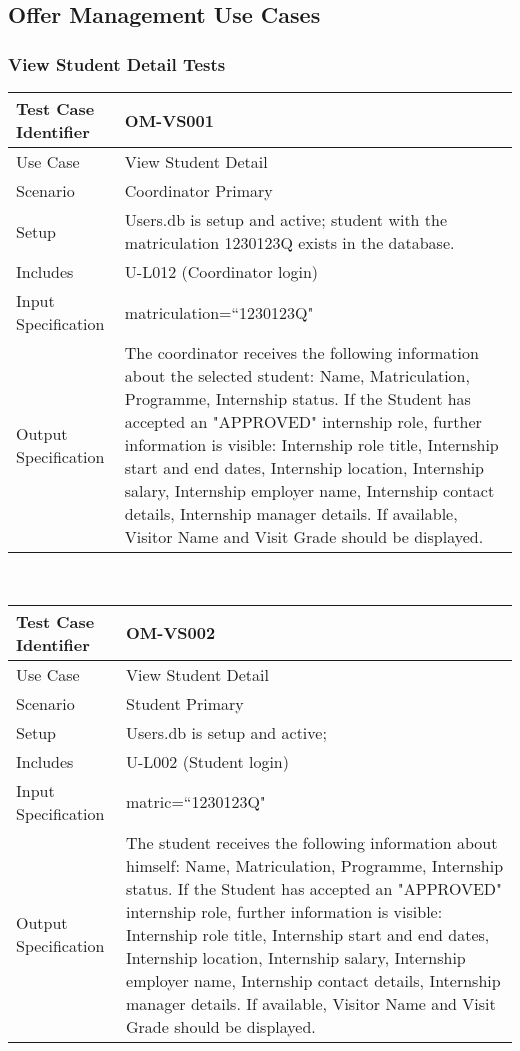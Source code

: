 \documentclass{l3deliverable}
\begin{document}
\newpage
\subsection{Offer Management Use Cases}
\subsubsection{View Student Detail Tests}
\begin{tabular}{lp{10cm}}
\hline 
\textbf{Test Case Identifier} & OM-VS001\tabularnewline
\hline 
\hline 
Use Case & View Student Detail \tabularnewline
\hline 
Scenario & Coordinator Primary \tabularnewline
\hline 
Setup & Users.db is setup and active; student with the matriculation 1230123Q exists in the database. \tabularnewline
\hline 
Includes & U-L012 (Coordinator login) \tabularnewline
\hline 
Input Specification & matriculation=``1230123Q" \tabularnewline
\hline 
Output Specification &  The coordinator receives the following information about the selected student: Name, Matriculation, Programme, Internship status. If the Student has accepted an "APPROVED" internship role, further information is visible: Internship role title, Internship start and end dates, Internship location, Internship salary, Internship employer name, Internship contact details, Internship manager details. If available, Visitor Name and Visit Grade should be displayed.\tabularnewline
\hline 
\end{tabular}\\


\begin{tabular}{lp{10cm}}
\hline 
\textbf{Test Case Identifier} & OM-VS002\tabularnewline
\hline 
\hline 
Use Case & View Student Detail \tabularnewline
\hline 
Scenario & Student Primary \tabularnewline
\hline 
Setup & Users.db is setup and active; \tabularnewline
\hline 
Includes & U-L002 (Student login) \tabularnewline
\hline 
Input Specification & matric=``1230123Q" \tabularnewline
\hline 
Output Specification &  The student receives the following information about himself: Name, Matriculation, Programme, Internship status. If the Student has accepted an "APPROVED" internship role, further information is visible: Internship role title, Internship start and end dates, Internship location, Internship salary, Internship employer name, Internship contact details, Internship manager details. If available, Visitor Name and Visit Grade should be displayed.\tabularnewline
\hline 
\end{tabular}\\
\end{document}
